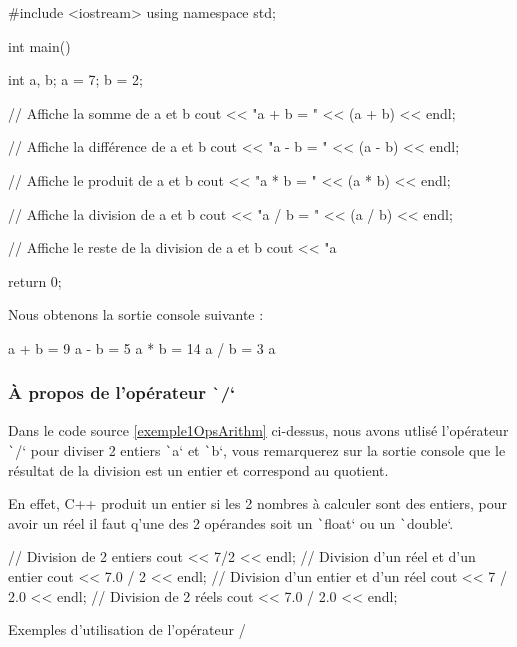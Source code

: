 \documentclass[10pt]{article}
\begin{document}
\begin{cppcode}
   #include <iostream>
    using namespace std;

    int main() {
        int a, b;
        a = 7;
        b = 2;

        // Affiche la somme de a et b
        cout << "a + b = " << (a + b) << endl;

        // Affiche la différence de a et b
        cout << "a - b = " << (a - b) << endl;

        // Affiche le produit de a et b
        cout << "a * b = " << (a * b) << endl;

        // Affiche la division de a et b
        cout << "a / b = " << (a / b) << endl;

        // Affiche le reste de la division de a et b
        cout << "a %

        return 0;
    } 
\end{cppcode}
\label{exemple1OpsArithm}

\bigskip
Nous obtenons la sortie console suivante :

\begin{textcode}
    a + b = 9
    a - b = 5
    a * b = 14
    a / b = 3
    a %
\end{textcode}


\subsubsection{À propos de l'opérateur \texttt`/` }
Dans le code source \ref{exemple1OpsArithm} ci-dessus, nous avons utlisé l'opérateur \texttt`/` pour diviser 2 entiers \texttt`a` et \texttt`b`, vous remarquerez sur la sortie console que le résultat de la division est un entier et correspond au quotient.

\smallskip
En effet, C++ produit un entier si les 2 nombres à calculer sont des entiers, pour avoir un réel il faut q'une des 2 opérandes soit un \texttt`float` ou un \texttt`double`.

\begin{cppcode}
    // Division de 2 entiers
    cout << 7/2 << endl; 
    // Division d'un réel et d'un entier
    cout << 7.0 / 2 << endl;
    // Division d'un entier et d'un réel
    cout << 7 / 2.0 << endl;
    // Division de 2 réels
    cout << 7.0 / 2.0 << endl;
\end{cppcode}
\caption{Exemples d'utilisation de l'opérateur / }
\end{document}
